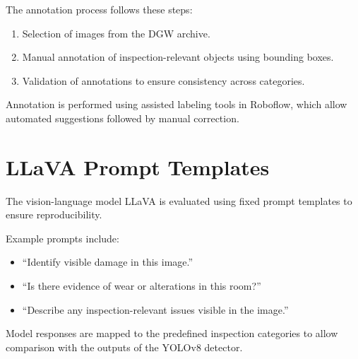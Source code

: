 The annotation process follows these steps:

\begin{enumerate}
    \item Selection of images from the DGW archive.
    \item Manual annotation of inspection-relevant objects using bounding boxes.
    \item Validation of annotations to ensure consistency across categories.
\end{enumerate}

Annotation is performed using assisted labeling tools in Roboflow, which allow automated suggestions followed by manual correction.

\section{LLaVA Prompt Templates}

The vision-language model LLaVA is evaluated using fixed prompt templates to ensure reproducibility.

Example prompts include:

\begin{itemize}
    \item ``Identify visible damage in this image.''
    \item ``Is there evidence of wear or alterations in this room?''
    \item ``Describe any inspection-relevant issues visible in the image.''
\end{itemize}

Model responses are mapped to the predefined inspection categories to allow comparison with the outputs of the YOLOv8 detector.

